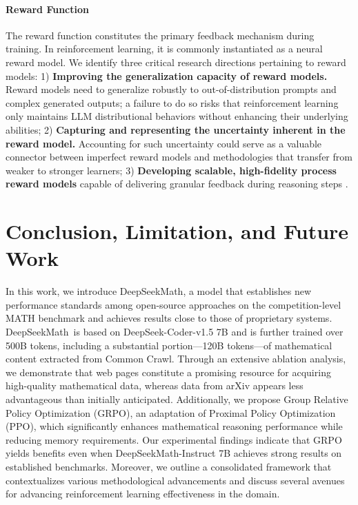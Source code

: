 \begin{itemize}[topsep=0pt]
\paragraph{Reward Function} The reward function constitutes the primary feedback mechanism during training. In reinforcement learning, it is commonly instantiated as a neural reward model. We identify three critical research directions pertaining to reward models: 1) \textbf{Improving the generalization capacity of reward models.} Reward models need to generalize robustly to out-of-distribution prompts and complex generated outputs; a failure to do so risks that reinforcement learning only maintains LLM distributional behaviors without enhancing their underlying abilities; 2) \textbf{Capturing and representing the uncertainty inherent in the reward model.} Accounting for such uncertainty could serve as a valuable connector between imperfect reward models and methodologies that transfer from weaker to stronger learners; 3) \textbf{Developing scalable, high-fidelity process reward models} capable of delivering granular feedback during reasoning steps \citep{lightman2023let,wang2023math}.

\section{Conclusion, Limitation, and Future Work}

In this work, we introduce DeepSeekMath, a model that establishes new performance standards among open-source approaches on the competition-level MATH benchmark and achieves results close to those of proprietary systems. DeepSeekMath~is based on DeepSeek-Coder-v1.5 7B and is further trained over 500B tokens, including a substantial portion—120B tokens—of mathematical content extracted from Common Crawl. Through an extensive ablation analysis, we demonstrate that web pages constitute a promising resource for acquiring high-quality mathematical data, whereas data from arXiv appears less advantageous than initially anticipated. Additionally, we propose Group Relative Policy Optimization (GRPO), an adaptation of Proximal Policy Optimization (PPO), which significantly enhances mathematical reasoning performance while reducing memory requirements. Our experimental findings indicate that GRPO yields benefits even when DeepSeekMath-Instruct 7B achieves strong results on established benchmarks. Moreover, we outline a consolidated framework that contextualizes various methodological advancements and discuss several avenues for advancing reinforcement learning effectiveness in the domain.


\end{itemize}
